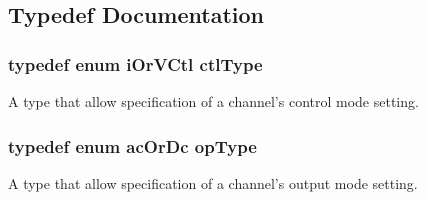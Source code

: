\subsection{Typedef Documentation}
\hypertarget{a00021_a5cd368998e9721e657fd7bc6d413807a}{
\subsubsection[{ctl\-Type}]{\setlength{\rightskip}{0pt plus 5cm}typedef enum {\bf i\-Or\-V\-Ctl} {\bf ctl\-Type}}}\label{a00021_a5cd368998e9721e657fd7bc6d413807a}
A type that allow specification of a channel's control mode setting. \hypertarget{a00021_acd90d47e6937efc4183ab0d18f787575}{
\subsubsection[{op\-Type}]{\setlength{\rightskip}{0pt plus 5cm}typedef enum {\bf ac\-Or\-Dc} {\bf op\-Type}}}\label{a00021_acd90d47e6937efc4183ab0d18f787575}
A type that allow specification of a channel's output mode setting. 

